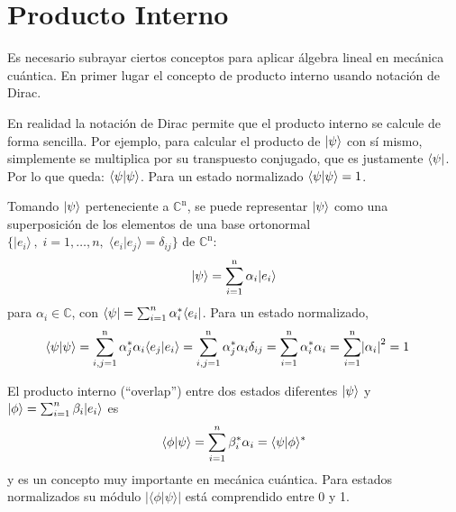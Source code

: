 \section{Producto Interno} \label{inner_prod}
Es necesario subrayar ciertos conceptos para aplicar álgebra lineal en mecánica cuántica. En primer lugar el concepto de producto interno usando notación de Dirac. 

En realidad la notación de Dirac permite que el producto interno se calcule de forma sencilla. Por ejemplo, para calcular el producto de $\ket{\psi}$ con sí mismo, simplemente se multiplica por su transpuesto conjugado, que es justamente  $\bra{\psi}$. Por lo que queda: $\braket{\psi}{\psi}$. Para un estado normalizado $\braket{\psi}{\psi}=1$.  %

Tomando $\ket{\psi}$ perteneciente a $\mathbb{C}^\textrm{n}$, se puede representar $\ket{\psi}$ como una superposición de los elementos de una  base ortonormal $\{|e_i\rangle\,,\;i=1,\ldots,n,\;\langle e_i|e_j\rangle=\delta_{ij}\}$ de  $\mathbb{C}^\textrm{n}$:
\begin{align}
    \ket{\psi} = \sum^\textrm{n}_{i=1}\alpha_i\ket{e_i} \nonumber
\end{align}
\noindent para $\alpha_i \in \mathbb{C}$, 
con $\langle \psi|=\sum_{i=1}^n \alpha_i^*\bra{e_i}$. Para un estado normalizado, 
\begin{align}
    \braket{\psi}{\psi} &= \sum^\textrm{n}_{i,j=1}\alpha_j^\ast\alpha_i\braket{e_j}{e_i}%
    = \sum^\textrm{n}_{i,j=1}\alpha_j^\ast\alpha_i\delta_{ij}%
    = \sum^\textrm{n}_{i=1}\alpha_i^\ast\alpha_i%
    = \sum^\textrm{n}_{i=1}\left|\alpha_i\right|^2 = 1\nonumber
\end{align}

El producto interno (``overlap'') entre  dos estados diferentes $\ket{\psi}$ y $\ket{\phi}=\sum_{i=1}^n \beta_i |e_i\rangle$ es 
\[\braket{\phi}{\psi} = \sum^n_{i=1}\beta_i^\ast\alpha_i=\langle\psi|\phi\rangle^*\] 
y es un concepto muy importante en mecánica cuántica. 
Para estados normalizados su m\'odulo $|\langle\phi|\psi\rangle|$  está comprendido entre 0 y 1. 
\vspace*{-3cm}




